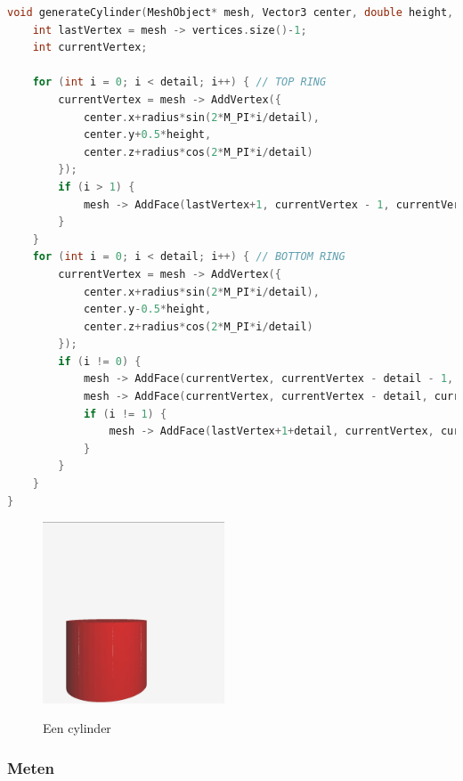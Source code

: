 \documentclass[12pt, a4paper]{article}
\begin{document}
\begin{lstlisting}[language=c++]
void generateCylinder(MeshObject* mesh, Vector3 center, double height, double radius, int detail) {
	int lastVertex = mesh -> vertices.size()-1;
	int currentVertex;
	
	for (int i = 0; i < detail; i++) { // TOP RING
		currentVertex = mesh -> AddVertex({
			center.x+radius*sin(2*M_PI*i/detail), 
			center.y+0.5*height, 
			center.z+radius*cos(2*M_PI*i/detail)
		});
		if (i > 1) {
			mesh -> AddFace(lastVertex+1, currentVertex - 1, currentVertex);
		}
	} 
	for (int i = 0; i < detail; i++) { // BOTTOM RING
		currentVertex = mesh -> AddVertex({
			center.x+radius*sin(2*M_PI*i/detail), 
			center.y-0.5*height, 
			center.z+radius*cos(2*M_PI*i/detail)
		});
		if (i != 0) {
			mesh -> AddFace(currentVertex, currentVertex - detail - 1, currentVertex - 1);
			mesh -> AddFace(currentVertex, currentVertex - detail, currentVertex - detail - 1);
			if (i != 1) {
				mesh -> AddFace(lastVertex+1+detail, currentVertex, currentVertex - 1);
			}
		}
	}
}
\end{lstlisting}

\begin{figure}[H]
	\centering
	\includegraphics[width=0.48\textwidth]{renders/test_003_mesh_highres.png}
	\label{fig:cylinder_mesh}
	\caption{Een cylinder}
\end{figure}

\subsubsection{Meten}
\end{document}
